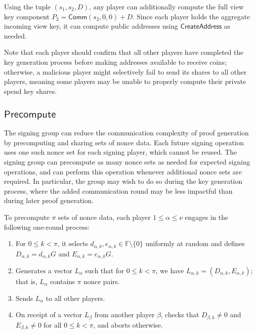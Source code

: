\documentclass{llncs}
\newcommand{\F}{\mathbb{F}}
\newcommand{\func}[1]{\mathsf{#1}}
\newcommand{\comm}{\func{Comm}}
\begin{document}
Using the tuple $(s_1,s_2,D)$, any player can additionally compute the full view key component $P_2 = \comm(s_2,0,0) + D$.
Since each player holds the aggregate incoming view key, it can compute public addresses using $\func{CreateAddress}$ as needed.

Note that each player should confirm that all other players have completed the key generation process before making addresses available to receive coins; otherwise, a malicious player might selectively fail to send its shares to all other players, meaning some players may be unable to properly compute their private spend key shares.


\subsection{\texorpdfstring{$\func{Precompute}$}{Precompute}}

The signing group can reduce the communication complexity of proof generation by precomputing and sharing sets of nonce data.
Each future signing operation uses one such nonce set for each signing player, which cannot be reused.
The signing group can precompute as many nonce sets as needed for expected signing operations, and can perform this operation whenever additional nonce sets are required.
In particular, the group may wish to do so during the key generation process, where the added communication round may be less impactful than during later proof generation.

To precompute $\pi$ sets of nonce data, each player $1 \leq \alpha \leq \nu$ engages in the following one-round process:
\begin{enumerate}
    \item For $0 \leq k < \pi$, it selects $d_{\alpha,k}, e_{\alpha,k} \in \F \setminus \{0\}$ uniformly at random and defines $D_{\alpha,k} = d_{\alpha,k}G$ and $E_{\alpha,k} = e_{\alpha,k}G$.
    \item Generates a vector $L_\alpha$ such that for $0 \leq k < \pi$, we have $L_{\alpha,k} = (D_{\alpha,k}, E_{\alpha,k})$; that is, $L_{\alpha}$ contains $\pi$ nonce pairs.
    \item Sends $L_\alpha$ to all other players.
    \item On receipt of a vector $L_\beta$ from another player $\beta$, checks that $D_{\beta,k} \neq 0$ and $E_{\beta,k} \neq 0$ for all $0 \leq k < \pi$, and aborts otherwise.
\end{enumerate}
\end{document}
